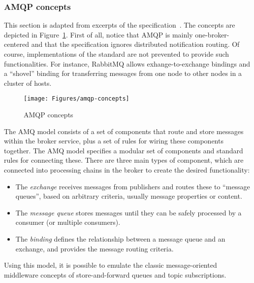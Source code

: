 \subsubsection{AMQP concepts}

This section is adapted from excerpts of the
specification~\cite{amqp}. The concepts are depicted in
Figure~\ref{F_amqp-concepts}. First of all, notice that AMQP is mainly
one-broker-centered and that the specification ignores distributed
notification routing. Of course, implementations of the standard are
not prevented to provide such functionalities. For instance,
\textsf{RabbitMQ} allows exhange-to-exchange bindings and a ``shovel''
binding for transferring messages from one node to other nodes in a
cluster of hosts.

\begin{figure}[htbp!]
\begin{center}
\texttt{[image: Figures/amqp-concepts]}
\caption{AMQP concepts}
\label{F_amqp-concepts}
\end{center}
\end{figure}

The AMQ model consists of a set of components that route and store
messages within the broker service, plus a set of rules for wiring
these components together. The AMQ model specifies a modular set of
components and standard rules for connecting these. There are three
main types of component, which are connected into processing chains in
the broker to create the desired functionality:
\begin{itemize}
\item The \textit{exchange} receives messages from publishers
  and routes these to ``message queues'', based on
  arbitrary criteria, usually message properties or content.
\item The \textit{message queue} stores messages until they can be
  safely processed by a consumer (or multiple consumers).
\item The \textit{binding} defines the relationship between a message
  queue and an exchange, and provides the message routing criteria.
\end{itemize}
Using this model, it is possible to emulate the classic
message-oriented middleware concepts of store-and-forward queues and
topic subscriptions.

